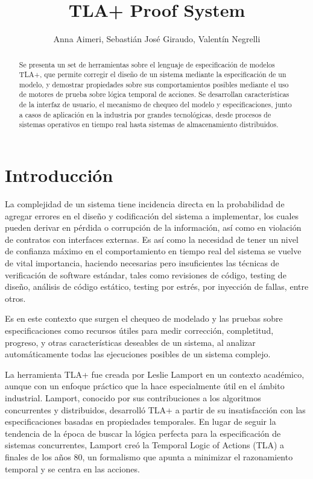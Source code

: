 \documentclass[runningheads]{llncs}
\begin{document}
\title{TLA+ Proof System}
\author{Anna Aimeri, Sebastián José Giraudo, Valentín Negrelli}
\maketitle             
\begin{abstract}
Se presenta un set de herramientas sobre el lenguaje de especificación de modelos TLA+, que permite corregir el diseño de un sistema mediante la especificación de un modelo, y demostrar propiedades sobre sus comportamientos posibles mediante el uso de motores de prueba sobre lógica temporal de acciones. Se desarrollan características de la interfaz de usuario, el mecanismo de chequeo del modelo y especificaciones, junto a casos de aplicación en la industria por grandes tecnológicas, desde procesos de sistemas operativos en tiempo real hasta sistemas de almacenamiento distribuidos.
\end{abstract}

\section{Introducción}
La complejidad de un sistema tiene incidencia directa en la probabilidad de agregar errores en el diseño y codificación del sistema a implementar, los cuales pueden derivar en pérdida o corrupción de la información, así como en violación de contratos con interfaces externas. Es así como la necesidad de tener un nivel de confianza máximo en el comportamiento en tiempo real del sistema se vuelve de vital importancia, haciendo necesarias pero insuficientes las técnicas de verificación de software estándar, tales como revisiones de código, testing de diseño, análisis de código estático, testing por estrés, por inyección de fallas, entre otros. 

Es en este contexto que surgen el chequeo de modelado y las pruebas sobre especificaciones como recursos útiles para medir corrección, completitud, progreso, y otras características deseables de un sistema, al analizar automáticamente todas las ejecuciones posibles de un sistema complejo.

La herramienta TLA+ fue creada por Leslie Lamport en un contexto académico, aunque con un enfoque práctico que la hace especialmente útil en el ámbito industrial. Lamport, conocido por sus contribuciones a los algoritmos concurrentes y distribuidos, desarrolló TLA+ a partir de su insatisfacción con las especificaciones basadas en propiedades temporales. En lugar de seguir la tendencia de la época de buscar la lógica perfecta para la especificación de sistemas concurrentes, Lamport creó la Temporal Logic of Actions (TLA) a finales de los años 80, un formalismo que apunta a minimizar el razonamiento temporal y se centra en las acciones.
\end{document}

